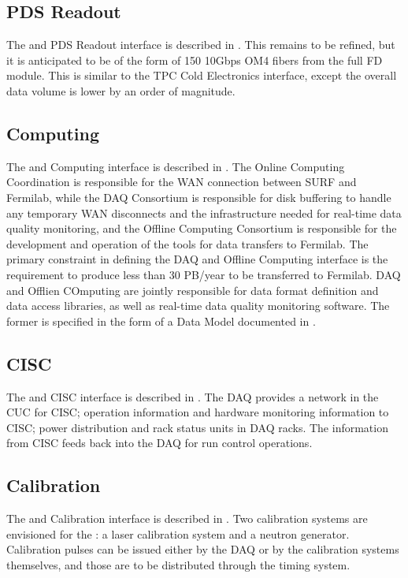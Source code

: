 \subsection{PDS Readout}
The  and PDS Readout interface is described in
. This remains to be refined, but it is anticipated to
be of the form of 150 10Gbps OM4 fibers from the full FD module. This
is similar to the TPC Cold Electronics interface, except the overall
data volume is lower by an order of magnitude.
\subsection{Computing}
The  and Computing interface is described in .
 The Online Computing
Coordination is responsible for the WAN connection between SURF and
Fermilab, while the DAQ Consortium is responsible for disk buffering
to handle any temporary WAN disconnects and the infrastructure needed
for real-time data quality monitoring, and the Offline Computing Consortium is
responsible for the development and operation of the tools for data
transfers to Fermilab. The primary
constraint in defining the DAQ and Offline Computing interface is the
requirement to produce less than 30 PB/year to be transferred to
Fermilab. DAQ and Offlien COmputing are jointly responsible for data
format definition and data access libraries, as well as real-time data
quality monitoring software. The former is specified in the form of a
Data Model documented in \citedocdb{}.

\subsection{CISC}
\label{sec:sp-daq:interfaces-cisc}
The  and CISC interface is described in
. The DAQ provides a network in the CUC for CISC; operation information and hardware
monitoring information to CISC; power distribution and
rack status units in DAQ racks. The information from CISC
feeds back into the DAQ for run control operations.
\subsection{Calibration}
The  and Calibration interface is described in
. Two calibration systems are envisioned for the
 : a laser calibration system and a neutron
generator. Calibration pulses can be issued either by the DAQ or by
the calibration systems themselves, and those are to be distributed through the
 timing system.
